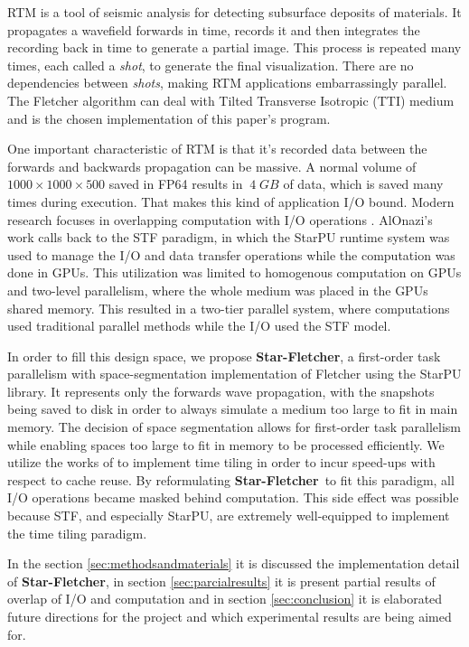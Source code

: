 \documentclass[12pt]{article}
\newcommand{\starflet}{\textbf{Star-Fletcher}}
\begin{document}
	RTM is a tool of seismic analysis for detecting subsurface deposits of materials. It propagates a wavefield forwards in time, records it and then integrates the recording back in time to generate a partial image. This process is repeated many times, each called a \textit{shot}, to generate the final visualization. There are no dependencies between \textit{shots}, making RTM applications embarrassingly parallel. The Fletcher algorithm \cite{fletcher_reverse_2009} can deal with Tilted Transverse Isotropic (TTI) medium and is the chosen implementation of this paper's program.

	One important characteristic of RTM is that it's recorded data between the forwards and backwards propagation can be massive. A normal volume of $1000 \times 1000 \times 500$ saved in FP64 results in $~4\;GB$ of data, which is saved many times during execution. That makes this kind of application I/O bound. Modern research focuses in overlapping computation with I/O operations \cite{alonazi_asynchronous_2019, kunas_enhancing_2025}. AlOnazi's work calls back to the STF paradigm, in which the StarPU runtime system was used to manage the I/O and data transfer operations while the computation was done in GPUs. This utilization was limited to homogenous computation on GPUs and two-level parallelism, where the whole medium was placed in the GPUs shared memory. This resulted in a two-tier parallel system, where computations used traditional parallel methods while the I/O used the STF model.

	In order to fill this design space, we propose \starflet, a first-order task parallelism with space-segmentation implementation of Fletcher using the StarPU library. It represents only the forwards wave propagation, with the snapshots being saved to disk in order to always simulate a medium too large to fit in main memory. The decision of space segmentation allows for first-order task parallelism while enabling spaces too large to fit in memory to be processed efficiently. We utilize the works of \cite{leandro_nesi_task-based_2020,qu_exploiting_2023} to implement time tiling in order to incur speed-ups with respect to cache reuse. By reformulating \starflet \, to fit this paradigm, all I/O operations became masked behind computation. This side effect was possible because STF, and  especially StarPU, are extremely well-equipped to implement the time tiling paradigm.

	In the section \ref{sec:methodsandmaterials} it is discussed the implementation detail of \starflet, in section \ref{sec:parcialresults} it is present partial results of overlap of I/O and computation and in section \ref{sec:conclusion} it is elaborated future directions for the project and which experimental results are being aimed for.
\end{document}
